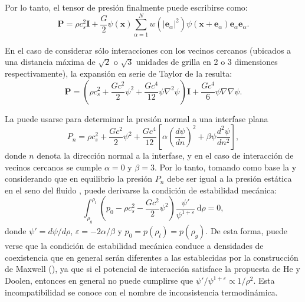 Por lo tanto, el tensor de presi\'on finalmente puede escribirse como:
\begin{equation}
	\bm{P} = \rho c_s^2 \bm{I} + \dfrac{G}{2}\psi(\bm{x}) \sum_{\alpha=1}^N w(|\bm{e}_{\alpha}|^2)\psi(\bm{x}+\bm{e}_{\alpha})\bm{e}_{\alpha}\bm{e}_{\alpha}.
	\label{eq:ptens_shan}
\end{equation}

En el caso de considerar s\'olo interacciones con los vecinos cercanos (ubicados a una distancia m\'axima de $\sqrt{2}$ o $\sqrt{3}$ unidades de grilla en 2 o 3 dimensiones respectivamente), la expansi\'on en serie de Taylor de la  resulta:
\begin{equation}
	\bm{P} = \left( \rho c_s^2 + \dfrac{G c^2}{2} \psi^2 + \dfrac{G c^4}{12} \psi \nabla^2 \psi \right) \bm{I} + \dfrac{G c^4}{6} \psi \nabla \nabla \psi.
	\label{eq:ptens_shan_taylor}	
\end{equation}

La  puede usarse para determinar la presi\'on normal a una interfase plana
\begin{equation}
	P_n = \rho c_s^2 + \dfrac{G c^2}{2} \psi^2 + \dfrac{G c^4}{12} \left[ \alpha \left( \dfrac{d\psi}{dn} \right)^2 + \beta \psi \dfrac{d^2 \psi}{dn^2} \right],
	\label{eq:ptens_shan_plane}	
\end{equation}
donde $n$ denota la direcci\'on normal a la interfase, y en el caso de interacci\'on de vecinos cercanos se cumple $\alpha = 0$ y $\beta = 3$. Por lo tanto, tomando como base la  y considerando que en equilibrio la presi\'on $P_n$ debe ser igual a la presi\'on est\'atica en el seno del fluido \cite{shan_pressure_2008}, puede derivarse la condici\'on de estabilidad mec\'anica:
\begin{equation}
	\int_{\rho_g}^{\rho_l} \left( p_0 - \rho c_s^2 - \dfrac{Gc^2}{2} \psi^2 \right) \dfrac{\psi'}{\psi^{1+\varepsilon}} \, \mbox{d}\rho = 0,
\end{equation}
donde $\psi' = d\psi / d\rho$, $\varepsilon=-2\alpha/\beta$ y $p_0=p(\rho_l)=p(\rho_g)$. De esta forma, puede verse que la condici\'on de estabilidad mec\'anica conduce a densidades de coexistencia que en general ser\'an diferentes a las establecidas por la construcci\'on de Maxwell (), ya que si el potencial de interacci\'on satisface la propuesta de He y Doolen, entonces en general no puede cumplirse que $\psi' / \psi^{1+\varepsilon} \propto 1/\rho^2$. Esta incompatibilidad se conoce con el nombre de inconsistencia termodin\'amica.


